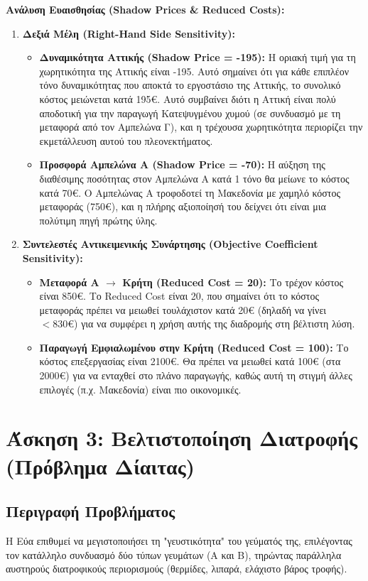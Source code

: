 \documentclass[12pt, a4paper]{article}
\begin{document}
\textbf{Ανάλυση Ευαισθησίας (Shadow Prices \& Reduced Costs):}

\begin{enumerate}
    \item \textbf{Δεξιά Μέλη (Right-Hand Side Sensitivity):}
    \begin{itemize}
        \item \textbf{Δυναμικότητα Αττικής (Shadow Price = -195):} Η οριακή τιμή για τη χωρητικότητα της Αττικής είναι -195. Αυτό σημαίνει ότι για κάθε επιπλέον τόνο δυναμικότητας που αποκτά το εργοστάσιο της Αττικής, το συνολικό κόστος μειώνεται κατά 195€. Αυτό συμβαίνει διότι η Αττική είναι πολύ αποδοτική για την παραγωγή Κατεψυγμένου χυμού (σε συνδυασμό με τη μεταφορά από τον Αμπελώνα Γ), και η τρέχουσα χωρητικότητα περιορίζει την εκμετάλλευση αυτού του πλεονεκτήματος.
        \item \textbf{Προσφορά Αμπελώνα Α (Shadow Price = -70):} Η αύξηση της διαθέσιμης ποσότητας στον Αμπελώνα Α κατά 1 τόνο θα μείωνε το κόστος κατά 70€. Ο Αμπελώνας Α τροφοδοτεί τη Μακεδονία με χαμηλό κόστος μεταφοράς (750€), και η πλήρης αξιοποίησή του δείχνει ότι είναι μια πολύτιμη πηγή πρώτης ύλης.
    \end{itemize}

    \item \textbf{Συντελεστές Αντικειμενικής Συνάρτησης (Objective Coefficient Sensitivity):}
    \begin{itemize}
        \item \textbf{Μεταφορά Α $\to$ Κρήτη (Reduced Cost = 20):} Το τρέχον κόστος είναι 850€. Το Reduced Cost είναι 20, που σημαίνει ότι το κόστος μεταφοράς πρέπει να μειωθεί τουλάχιστον κατά 20€ (δηλαδή να γίνει $<830€$) για να συμφέρει η χρήση αυτής της διαδρομής στη βέλτιστη λύση.
        \item \textbf{Παραγωγή Εμφιαλωμένου στην Κρήτη (Reduced Cost = 100):} Το κόστος επεξεργασίας είναι 2100€. Θα πρέπει να μειωθεί κατά 100€ (στα 2000€) για να ενταχθεί στο πλάνο παραγωγής, καθώς αυτή τη στιγμή άλλες επιλογές (π.χ. Μακεδονία) είναι πιο οικονομικές.
    \end{itemize}
\end{enumerate}

\section*{Άσκηση 3: Βελτιστοποίηση Διατροφής (Πρόβλημα Δίαιτας)}

\subsection*{Περιγραφή Προβλήματος}
Η Εύα επιθυμεί να μεγιστοποιήσει τη "γευστικότητα" του γεύματός της, επιλέγοντας τον κατάλληλο συνδυασμό δύο τύπων γευμάτων (Α και Β), τηρώντας παράλληλα αυστηρούς διατροφικούς περιορισμούς (θερμίδες, λιπαρά, ελάχιστο βάρος τροφής).
\end{document}
